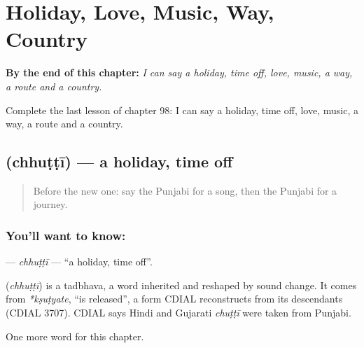 
\chapter{Holiday, Love, Music, Way, Country}
\label{ch:pa-holiday-love-music-way-country}

\begin{chapteropening}
\textbf{By the end of this chapter:} \emph{I can say a holiday, time off, love, music, a way, a route and a country.}

Complete the last lesson of chapter 98: I can say a holiday, time off, love, music, a way, a route and a country.
\end{chapteropening}

\section[\texorpdfstring{\pa{ਛੁੱਟੀ} (chhuṭṭī)}{ਛੁੱਟੀ (chhuṭṭī)}]{ (chhuṭṭī) — a holiday, time off}

\label{lesson:PA-C98-chhutti}



\begin{quote}
Before the new one: say the Punjabi for a song, then the Punjabi for a journey.
\end{quote}

\subsection*{You'll want to know: }
\textbf{} — \emph{chhuṭṭī} — \textquotedblleft{}a holiday, time off\textquotedblright{}.

\begin{cousinweb}
\textbf{} (\emph{chhuṭṭī}) is a tadbhava, a word inherited and reshaped by sound change. It comes from \emph{*kṣuṭyate}, \textquotedblleft{}is released\textquotedblright{}, a form CDIAL reconstructs from its descendants (CDIAL 3707). CDIAL says Hindi and Gujarati \emph{chuṭṭī} were taken from Punjabi.
\end{cousinweb}

\begin{grammarlens}[title={What you've built}]
One more word for this chapter.
\end{grammarlens}

